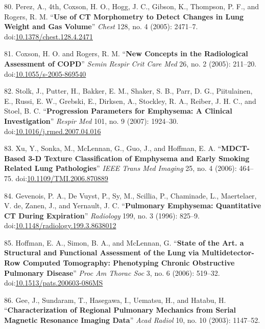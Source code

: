 \documentclass[11pt,]{article}
\begin{document}
\hypertarget{ref-Perez:2005aa}{}
80. Perez, A., 4th, Coxson, H. O., Hogg, J. C., Gibson, K., Thompson, P.
F., and Rogers, R. M. ``\textbf{Use of CT Morphometry to Detect Changes
in Lung Weight and Gas Volume}'' \emph{Chest} 128, no. 4 (2005):
2471--7.
doi:\href{https://doi.org/10.1378/chest.128.4.2471}{10.1378/chest.128.4.2471}

\hypertarget{ref-Coxson:2005aa}{}
81. Coxson, H. O. and Rogers, R. M. ``\textbf{New Concepts in the
Radiological Assessment of COPD}'' \emph{Semin Respir Crit Care Med} 26,
no. 2 (2005): 211--20.
doi:\href{https://doi.org/10.1055/s-2005-869540}{10.1055/s-2005-869540}

\hypertarget{ref-Stolk:2007aa}{}
82. Stolk, J., Putter, H., Bakker, E. M., Shaker, S. B., Parr, D. G.,
Piitulainen, E., Russi, E. W., Grebski, E., Dirksen, A., Stockley, R.
A., Reiber, J. H. C., and Stoel, B. C. ``\textbf{Progression Parameters
for Emphysema: A Clinical Investigation}'' \emph{Respir Med} 101, no. 9
(2007): 1924--30.
doi:\href{https://doi.org/10.1016/j.rmed.2007.04.016}{10.1016/j.rmed.2007.04.016}

\hypertarget{ref-Xu:2006aa}{}
83. Xu, Y., Sonka, M., McLennan, G., Guo, J., and Hoffman, E. A.
``\textbf{MDCT-Based 3-D Texture Classification of Emphysema and Early
Smoking Related Lung Pathologies}'' \emph{IEEE Trans Med Imaging} 25,
no. 4 (2006): 464--75.
doi:\href{https://doi.org/10.1109/TMI.2006.870889}{10.1109/TMI.2006.870889}

\hypertarget{ref-Gevenois:1996aa}{}
84. Gevenois, P. A., De Vuyst, P., Sy, M., Scillia, P., Chaminade, L.,
Maertelaer, V. de, Zanen, J., and Yernault, J. C. ``\textbf{Pulmonary
Emphysema: Quantitative CT During Expiration}'' \emph{Radiology} 199,
no. 3 (1996): 825--9.
doi:\href{https://doi.org/10.1148/radiology.199.3.8638012}{10.1148/radiology.199.3.8638012}

\hypertarget{ref-Hoffman:2006aa}{}
85. Hoffman, E. A., Simon, B. A., and McLennan, G. ``\textbf{State of
the Art. a Structural and Functional Assessment of the Lung via
Multidetector-Row Computed Tomography: Phenotyping Chronic Obstructive
Pulmonary Disease}'' \emph{Proc Am Thorac Soc} 3, no. 6 (2006): 519--32.
doi:\href{https://doi.org/10.1513/pats.200603-086MS}{10.1513/pats.200603-086MS}

\hypertarget{ref-Gee:2003aa}{}
86. Gee, J., Sundaram, T., Hasegawa, I., Uematsu, H., and Hatabu, H.
``\textbf{Characterization of Regional Pulmonary Mechanics from Serial
Magnetic Resonance Imaging Data}'' \emph{Acad Radiol} 10, no. 10 (2003):
1147--52.
\end{document}
